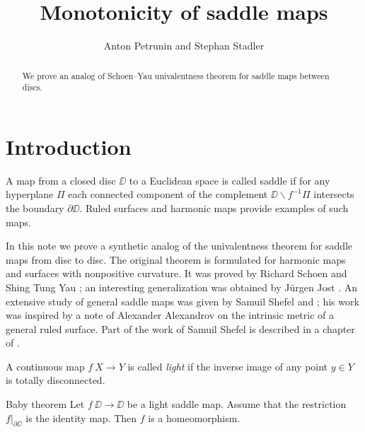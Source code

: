 \documentclass{article}
\begin{document}
\title{Monotonicity of saddle maps}
\author{Anton Petrunin and Stephan Stadler}


\date{}

\maketitle

\begin{abstract}
We prove an analog of Schoen--Yau univalentness theorem for saddle maps between discs.
\end{abstract}

\section{Introduction}

A map from a closed disc $\DD$ to a Euclidean space is called saddle if for any hyperplane $\Pi$ each connected component of the 
complement $\DD\backslash f^{-1}\Pi$ intersects the boundary $\partial \DD$.
Ruled surfaces and harmonic maps provide examples of such maps.

In this note we prove a synthetic analog of the univalentness theorem for saddle maps from disc to disc.
The original theorem is formulated for harmonic maps and  surfaces with nonpositive curvature.
It was proved by Richard Schoen and Shing Tung Yau \cite{schoen-yau};
an interesting generalization was obtained by J\"urgen Jost \cite{jost}.
An extensive study of general saddle maps was given by Samuil Shefel \cite{shefel-2D} and \cite{shefel-3D};
his work was inspired by a note of Alexander Alexandrov \cite{A} on the intrinsic metric of a general ruled surface.
Part of the work of Samuil Shefel is described in a chapter of \cite{akp}.

A continuous map $f\:X\to Y$ is called \emph{light} if the inverse image of any point $y\in Y$ is totally disconnected.

\begin{thm}{Baby theorem}\label{baby}
Let $f\:\DD\to \DD$ be a light saddle map.
Assume that 
the restriction $f|_{\partial\DD}$ is the identity map.
Then $f$ is a homeomorphism.
\end{thm}
\end{document}
